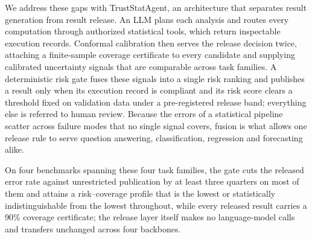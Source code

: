 \documentclass[preprint,12pt,authoryear]{elsarticle}
\begin{document}
{We address these gaps with TrustStatAgent, an architecture that separates result generation from result release. An LLM plans each analysis and routes every computation through authorized statistical tools, which return inspectable execution records. Conformal calibration then serves the release decision twice, attaching a finite-sample coverage certificate to every candidate and supplying calibrated uncertainty signals that are comparable across task families. A deterministic risk gate fuses these signals into a single risk ranking and publishes a result only when its execution record is compliant and its risk score clears a threshold fixed on validation data under a pre-registered release band; everything else is referred to human review. Because the errors of a statistical pipeline scatter across failure modes that no single signal covers, fusion is what allows one release rule to serve question answering, classification, regression and forecasting alike.

On four benchmarks spanning these four task families, the gate cuts the released error rate against unrestricted publication by at least three quarters on most of them and attains a risk--coverage profile that is the lowest or statistically indistinguishable from the lowest throughout, while every released result carries a 90\% coverage certificate; the release layer itself makes no language-model calls and transfers unchanged across four backbones.

}
\end{document}
